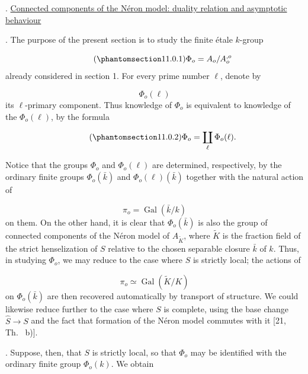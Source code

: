 
\medskip
{}. \underline{Connected components of the N\'eron model: duality
relation and asymptotic behaviour}

\smallskip
\noindent
{}. The purpose of the present section is to study the finite \'etale
$k$-group

\begin{equation}\tag{\SGARefTarget{sga7.sga7i.eix.n11-0-1}{11.0.1}}
\Phi_o=A_o/A_o^{,o}
\end{equation}
already considered in section 1. For every prime number $\ell$, denote
by

\begin{equation*}
\Phi_o(\ell)
\end{equation*}
its $\ell$-primary component. Thus knowledge of $\Phi_o$ is equivalent
to knowledge of the $\Phi_o(\ell)$, by the formula

\begin{equation}\tag{\SGARefTarget{sga7.sga7i.eix.n11-0-2}{11.0.2}}
\Phi_o=\coprod_\ell\Phi_o(\ell).
\end{equation}

Notice that the groups $\Phi_o$ and $\Phi_o(\ell)$ are determined,
respectively, by the ordinary finite groups $\Phi_o(\bar k)$ and
$\Phi_o(\ell)(\bar k)$ together with the natural action of

\begin{equation*}
\pi_o=\operatorname{Gal}(\bar k/k)
\end{equation*}
on them. On the other hand, it is clear that $\Phi_o(\bar k)$ is also
the group of connected components of the N\'eron model of
$A_{\widetilde K}$, where $\widetilde K$ is the fraction field of the
strict henselization of $S$ relative to the chosen separable closure
$\bar k$ of $k$. Thus, in studying $\Phi_o$, we may reduce to the case
where $S$ is strictly local; the actions of

\begin{equation*}
\pi_o\simeq\operatorname{Gal}(\widetilde K/K)
\end{equation*}
on $\Phi_o(\bar k)$ are then recovered automatically by transport of
structure. We could likewise reduce further to the case where $S$ is
complete, using the base change $\widehat S\longrightarrow S$ and the
fact that formation of the N\'eron model commutes with it
[21, Th.~ b)].

\smallskip
\noindent
{}. Suppose, then, that $S$ is strictly local, so that $\Phi_o$ may be
identified with the ordinary finite group $\Phi_o(k)$. We obtain

